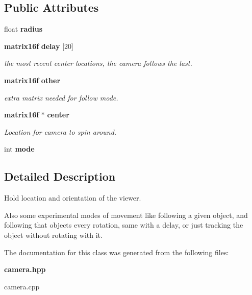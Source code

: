 \subsection*{Public Attributes}
\begin{CompactItemize}
\item 
{}
float {\bf radius}\label{classcamera_m0}

\item 
{}
{\bf matrix16f} {\bf delay} [20]\label{classcamera_m1}

\begin{CompactList}\small\item\em the most recent center locations, the camera follows the last.\item\end{CompactList}\item 
{}
{\bf matrix16f} {\bf other}\label{classcamera_m2}

\begin{CompactList}\small\item\em extra matrix needed for follow mode.\item\end{CompactList}\item 
{}
{\bf matrix16f} $\ast$ {\bf center}\label{classcamera_m3}

\begin{CompactList}\small\item\em Location for camera to spin around.\item\end{CompactList}\item 
{}
int {\bf mode}\label{classcamera_m4}

\end{CompactItemize}


\subsection{Detailed Description}
Hold location and orientation of the viewer.

Also some experimental modes of movement  like following a given object, and following that objects every rotation, same with a delay, or just tracking the object without rotating with it. 



The documentation for this class was generated from the following files:\begin{CompactItemize}
\item 
{\bf camera.hpp}\item 
camera.cpp\end{CompactItemize}
